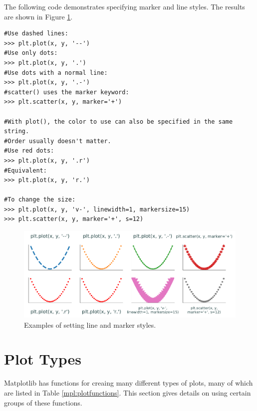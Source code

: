 The following code demonstrates specifying marker and line styles. The results are shown in Figure \ref{mpl:linestyles}.
\begin{lstlisting}
#Use dashed lines:
>>> plt.plot(x, y, '--')
#Use only dots:
>>> plt.plot(x, y, '.')
#Use dots with a normal line:
>>> plt.plot(x, y, '.-')
#scatter() uses the marker keyword:
>>> plt.scatter(x, y, marker='+')

#With plot(), the color to use can also be specified in the same string.
#Order usually doesn't matter.
#Use red dots:
>>> plt.plot(x, y, '.r')
#Equivalent:
>>> plt.plot(x, y, 'r.')

#To change the size:
>>> plt.plot(x, y, 'v-', linewidth=1, markersize=15)
>>> plt.scatter(x, y, marker='+', s=12)
\end{lstlisting}

\begin{figure}[H]
\centering
\includegraphics[width=\textwidth]{figures/linestyles_example.pdf}
\caption{Examples of setting line and marker styles.}
\label{mpl:linestyles}
\end{figure}

\section*{Plot Types} %
Matplotlib has functions for creaing many different types of plots, many of which are listed in Table \ref{mpl:plotfunctions}.
This section gives details on using certain groups of these functions.

